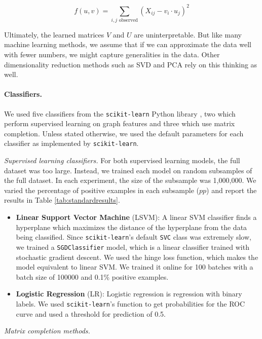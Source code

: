 \documentclass{article} %
\begin{document}
$$
f(u, v) = \sum_{i,j \text{ observed}} (X_{ij} - v_i \cdot u_j)^2
$$

Ultimately, the learned matrices $V$ and $U$ are uninterpretable. But like many machine learning methods, we assume that if we can approximate the data well with fewer numbers, we might capture generalities in the data. Other dimensionality reduction methods such as SVD and PCA rely on this thinking as well.

\paragraph{Classifiers.} We used five classifiers from the \texttt{scikit-learn} Python library \cite{scikit-learn}, two which perform supervised learning on graph features and three which use matrix completion. Unless stated otherwise, we used the default parameters for each classifier as implemented by \texttt{scikit-learn}.

\emph{Supervised learning classifiers.} For both supervised learning models, the full dataset was too large. Instead, we trained each model on random subsamples of the full dataset. In each experiment, the size of the subsample was 1,000,000. We varied the percentage of positive examples in each subsample ($pp$) and report the results in Table \ref{tab:standardresults}.

\begin{itemize}

    \item \textbf{Linear Support Vector Machine} (LSVM): A linear SVM classifier finds a hyperplane which maximizes the distance of the hyperplane from the data being classified. Since \texttt{scikit-learn}'s default \texttt{SVC} class was extremely slow, we trained a \texttt{SGDClassifier} model, which is a linear classifier trained with stochastic gradient descent. We used the hinge loss function, which makes the model equivalent to linear SVM. We trained it online for 100 batches with a batch size of 100000 and 0.1\% positive examples.

    \item \textbf{Logistic Regression} (LR): Logistic regression is regression with binary labels. We used \texttt{scikit-learn}'s  function to get probabilities for the ROC curve and used a threshold for prediction of 0.5.

\end{itemize}

\emph{Matrix completion methods.}
\end{document}
